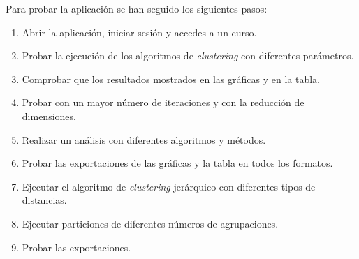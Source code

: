 Para probar la aplicación se han seguido los siguientes pasos:
\begin{enumerate}
	\item Abrir la aplicación, iniciar sesión y accedes a un curso.
	\item Probar la ejecución de los algoritmos de \emph{clustering} con diferentes parámetros.
	\item Comprobar que los resultados mostrados en las gráficas y en la tabla.
	\item Probar con un mayor número de iteraciones y con la reducción de dimensiones.
	\item Realizar un análisis con diferentes algoritmos y métodos.
	\item Probar las exportaciones de las gráficas y la tabla en todos los formatos.
	\item Ejecutar el algoritmo de \emph{clustering} jerárquico con diferentes tipos de distancias.
	\item Ejecutar particiones de diferentes números de agrupaciones.
	\item Probar las exportaciones.
\end{enumerate}

